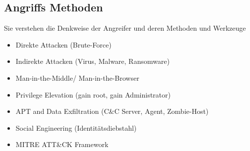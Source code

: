 \subsection{Angriffs Methoden}
Sie verstehen die Denkweise der Angreifer und deren
Methoden und Werkzeuge

\begin{itemize}
    \item Direkte Attacken (Brute-Force)
    \item Indirekte Attacken (Virus, Malware, Ransomware)
    \item Man-in-the-Middle/ Man-in-the-Browser
    \item Privilege Elevation (gain root, gain Administrator)
    \item APT and Data Exfiltration (C\&C Server, Agent, Zombie-Host)
    \item Social Engineering (Identitätsdiebstahl)
    \item MITRE ATT\&CK Framework
\end{itemize}


